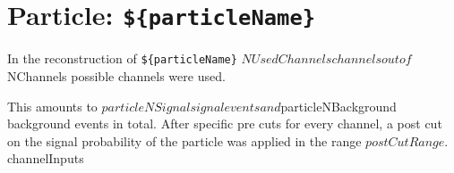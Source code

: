
\FloatBarrier
\clearpage
\cprotect\section{Particle: \verb|${particleName}|}
In the reconstruction of \verb|${particleName}| ${NUsedChannels} channels out of ${NChannels} possible channels were used.
This amounts to ${particleNSignal} signal events and ${particleNBackground} background events in total.
After specific pre cuts for every channel, a post cut on the signal probability of the particle was applied in the range ${postCutRange}.

${channelInputs}

